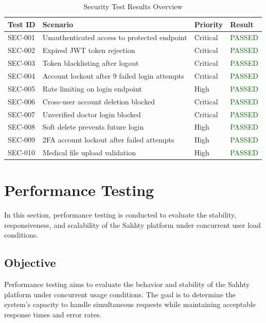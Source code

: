 \begin{table}[H]
\centering
\caption{Security Test Results Overview}
\label{tab:security_results}
\renewcommand{\arraystretch}{1.3}

\begin{tabular}{|p{2cm}|p{9cm}|p{2cm}|p{1.8cm}|}
\hline
\rowcolor{red!10}

\textbf{Test ID} & \textbf{Scenario} & \textbf{Priority} & \textbf{Result} \\
\hline
SEC-001 & Unauthenticated access to protected endpoint & Critical & \textcolor{darkgreen}{PASSED} \\
\hline
SEC-002 & Expired JWT token rejection & Critical & \textcolor{darkgreen}{PASSED} \\
\hline
SEC-003 & Token blacklisting after logout & Critical & \textcolor{darkgreen}{PASSED} \\
\hline
SEC-004 & Account lockout after 9 failed login attempts & Critical & \textcolor{darkgreen}{PASSED} \\
\hline
SEC-005 & Rate limiting on login endpoint & High & \textcolor{darkgreen}{PASSED} \\
\hline
SEC-006 & Cross-user account deletion blocked & Critical & \textcolor{darkgreen}{PASSED} \\
\hline
SEC-007 & Unverified doctor login blocked & Critical & \textcolor{darkgreen}{PASSED} \\
\hline
SEC-008 & Soft delete prevents future login & High & \textcolor{darkgreen}{PASSED} \\
\hline
SEC-009 & 2FA account lockout after failed attempts & High & \textcolor{darkgreen}{PASSED} \\
\hline
SEC-010 & Medical file upload validation & High & \textcolor{darkgreen}{PASSED} \\
\hline
\end{tabular}
\end{table}

\section{Performance Testing}

In this section, performance testing is conducted to evaluate the stability, responsiveness, and scalability of the Sahhty platform under concurrent user load conditions.
\subsection{Objective}
Performance testing aims to evaluate the behavior and stability of the Sahhty
platform under concurrent usage conditions. The goal is to determine the
system's capacity to handle simultaneous requests while maintaining acceptable
response times and error rates.

